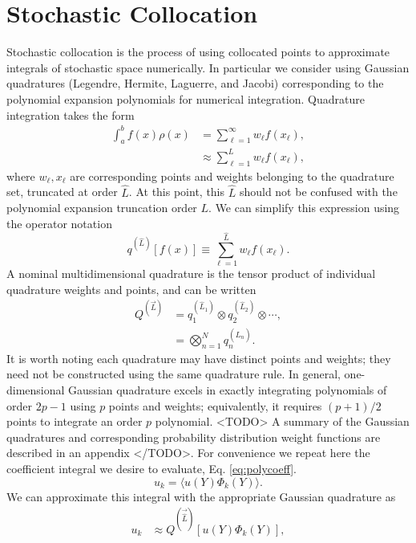 \section{Stochastic Collocation}
Stochastic collocation is the process of using collocated points to approximate integrals of stochastic space
numerically.  In particular we consider using Gaussian quadratures (Legendre, Hermite, Laguerre, and Jacobi)
corresponding to the polynomial expansion polynomials for numerical integration.  Quadrature integration takes
the form
\begin{align}
  \int_a^b f(x)\rho(x) &= \sum_{\ell=1}^\infty w_\ell f(x_\ell),\\
  &\approx \sum_{\ell=1}^L w_\ell f(x_\ell),
\end{align}
where $w_\ell,x_\ell$ are corresponding points and weights belonging to the quadrature set, truncated at order
$\hat L$.  At this point, this $\hat L$ should not be confused with the polynomial expansion truncation order $L$.  We
can simplify this expression using the operator notation
\begin{equation}\label{eq:quad op}
  q^{(\hat L)}[f(x)] \equiv \sum_{\ell=1}^{\hat L} w_\ell f(x_\ell).
\end{equation}
A nominal multidimensional quadrature is the tensor product of
individual quadrature weights and points, and can be written
\begin{align}
  Q^{(\vec{L})} &= q^{(\hat L_1)}_1 \otimes q^{(\hat L_2)}_2 \otimes \cdots,\\
                     &= \bigotimes_{n=1}^N q^{(\hat L_n)}_n.
\end{align}
It is worth noting each quadrature may have distinct points and weights; they need not be constructed using
the same quadrature rule.
In general, one-dimensional Gaussian
quadrature excels in exactly integrating polynomials of order $2p-1$ using $p$ points and weights;
equivalently, it requires $(p+1)/2$ points to integrate an order $p$ polynomial. <TODO> A
summary of the Gaussian quadratures and corresponding probability distribution weight functions are described
in an appendix </TODO>.  For convenience we repeat here the coefficient integral we desire to evaluate, Eq.
\ref{eq:polycoeff}.
\begin{equation}
  u_k = \langle u(Y)\Phi_k(Y) \rangle.
\end{equation}
We can approximate this integral with the appropriate Gaussian quadrature as
\begin{align}
  u_k &\approx Q^{(\vec{\hat L})}[u(Y)\Phi_k(Y)],
\end{align}

